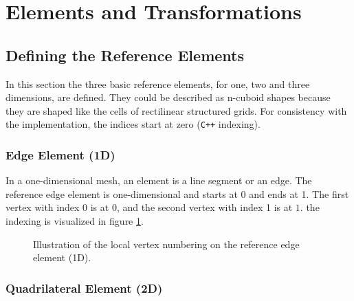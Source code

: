 
\section{Elements and Transformations}
\label{sec:elements}
\subsection{Defining the Reference Elements}

In this section the three basic reference elements, for one, two and three dimensions, are defined.
They could be described as n-cuboid shapes because they are shaped like the cells of rectilinear structured grids.
For consistency with the implementation, the indices start at zero (\texttt{C++} indexing).

\subsubsection{Edge Element (1D)}

In a one-dimensional mesh, an element is a line segment or an edge.
The reference edge element is one-dimensional and starts at 0 and ends at 1.
The first vertex with index 0 is at $0$, and the second vertex with index 1 is at $1$.
the indexing is visualized in figure \ref{fig:edge_element}.

\begin{figure}[h]
    \vspace{0.5cm}
    \centering
    \caption{Illustration of the local vertex numbering on the reference edge element (1D).}
    \label{fig:edge_element}
\end{figure}

\subsubsection{Quadrilateral Element (2D)}

